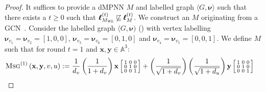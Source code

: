 \begin{proof}
It suffices to provide a dMPNN $M$ and labelled graph $\langle G,\pmb{\nu}\rangle$ such that there exists a $t\geq 0$ such that $\pmb{\ell}_{M_{\textsl{WL}}}^{(t)}\not\sqsubseteq \pmb{\ell}_M^{(t)}$. We construct an $M$ originating
from a GCN~\cite{kipf-loose}.
Consider the labelled graph $\langle G,\pmb{\nu})$ () with 
vertex labelling  $\pmb{\nu}_{v_1}=\pmb{\nu}_{v_2}=[1,0,0]$,
$\pmb{\nu}_{v_3}=\pmb{\nu}_{v_6}=[0,1,0]$ and $\pmb{\nu}_{v_4}=\pmb{\nu}_{v_5}=[0,0,1]$. 
We define $M$ such that for round $t=1$ and $\mathbf{x},\mathbf{y}\in\mathbb{A}^3$:
\begin{align*}
\textsc{Msg}^{(1)}\left(\mathbf{x},\mathbf{y},v,u\right)&:=
\frac{1}{d_v}\left(\frac{1}{1+d_v}\right)\mathbf{x}\left[\begin{smallmatrix}
1 & 0 & 0\\
0 & 1 & 0\\
0 & 0 & 1
\end{smallmatrix}\right]+
\left(\frac{1}{\sqrt{1+d_v}}\right)\left(\frac{1}{\sqrt{1+d_u}}\right)\mathbf{y}\left[\begin{smallmatrix}
1 & 0 & 0\\
0 & 1 & 0\\
0 & 0 & 1
\end{smallmatrix}\right]

\end{align*}
\end{proof}
